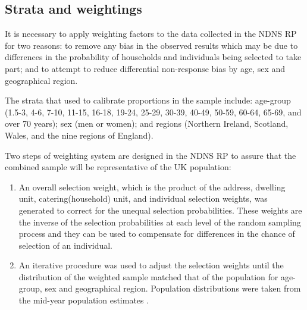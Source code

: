 \subsection{Strata and weightings}\vspace{-0.3cm}

It is necessary to apply weighting factors to the data collected in the NDNS RP for two reasons: to remove any bias in the observed results which may be due to differences in the probability of households and individuals being selected to take part; and to attempt to reduce differential non-response bias by age, sex and geographical region. 

The strata that used to calibrate proportions in the sample include: age-group (1.5-3, 4-6, 7-10, 11-15, 16-18, 19-24, 25-29, 30-39, 40-49, 50-59, 60-64, 65-69, and over 70 years); sex (men or women); and regions (Northern Ireland, Scotland, Wales, and the nine regions of England). 

Two steps of weighting system are designed in the NDNS RP to assure that the combined sample will be representative of the UK population: 

\begin{enumerate}
	\item An overall selection weight, which is the product of the address, dwelling unit, catering(household) unit, and individual selection weights, was generated to correct for the unequal selection probabilities. These weights are the inverse of the selection probabilities at each level of the random sampling process and they can be used to compensate for differences in the chance of selection of an individual.
	\item An iterative procedure was used to adjust the selection weights until the distribution of the weighted sample matched that of the population for age-group, sex and geographical region. Population distributions were taken from the mid-year population estimates \parencite{OfficeofNationalStat}. 
\end{enumerate}


